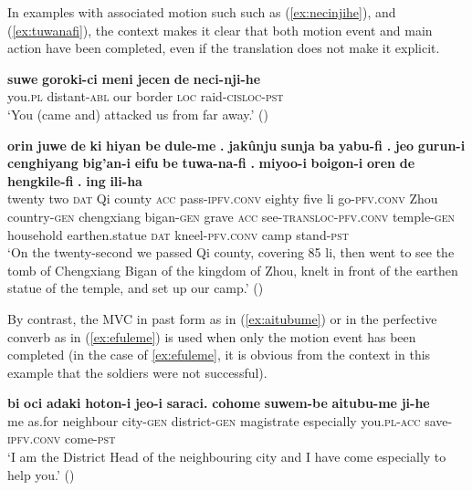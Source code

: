 \documentclass{article}
\newcommand{\ipa}[1]{\textbf{{\phon\mbox{#1}}}} %
\begin{document}
In examples with associated motion such such as (\ref{ex:necinjihe}), and (\ref{ex:tuwanafi}), the context makes it clear that both motion event and main action have been completed, even if the translation does not make it explicit.
\begin{exe}
\ex \label{ex:necinjihe}
\gll
\ipa{suwe}	\ipa{goroki-ci}	\ipa{meni}	\ipa{jecen}	\ipa{de}	\ipa{neci-nji-he}	 \\
you.\textsc{pl} distant-\textsc{abl} our border \textsc{loc} raid-\textsc{cisloc-pst} \\
\glt ‘You (came and) attacked us from far away.' (\citealt[503;870]{stary83sakda})
\end{exe}
\begin{exe}
\ex \label{ex:tuwanafi}
\gll
\ipa{orin} 	\ipa{juwe} 	\ipa{de} 	\ipa{ki} 	\ipa{hiyan} 	\ipa{be} 	\ipa{dule-me} 	\ipa{.} 	\ipa{jakûnju} 	\ipa{sunja} 	\ipa{ba} 	\ipa{yabu-fi} 	\ipa{.} 	\ipa{jeo} 	\ipa{gurun-i} 	\ipa{cenghiyang} 	\ipa{big’an-i} 	\ipa{eifu} 	\ipa{be} 	\ipa{tuwa-na-fi} 	\ipa{.} 	\ipa{miyoo-i} 	\ipa{boigon-i} 	\ipa{oren} 	\ipa{de} 	\ipa{hengkile-fi} 	\ipa{.} 	\ipa{ing} 	\ipa{ili-ha} \\
twenty two \textsc{dat} Qi county \textsc{acc} pass-\textsc{ipfv.conv} { } eighty five li  go-\textsc{pfv.conv} { } Zhou country-\textsc{gen} chengxiang bigan-\textsc{gen} grave \textsc{acc} see-\textsc{transloc-pfv.conv} { } temple-\textsc{gen} household earthen.statue \textsc{dat} kneel-\textsc{pfv.conv} { } camp stand-\textsc{pst} \\
\glt `On the twenty-second we passed Qi county, covering 85 li, then went to see the tomb of Chengxiang Bigan of the kingdom of Zhou, knelt in front of the earthen statue of the temple, and set up our camp.' (\citealt[83/103]{cosmo06dzengseo})
\end{exe}

By contrast, the MVC in past form as in (\ref{ex:aitubume}) or in the perfective converb as in (\ref{ex:efuleme}) is used when only the motion event has been completed (in the case of \ref{ex:efuleme}, it is obvious from the context in this example that the soldiers were not successful).

\begin{exe}
\ex \label{ex:aitubume}
\gll
\ipa{bi}	\ipa{oci}	\ipa{adaki}	\ipa{hoton-i}	\ipa{jeo-i}	\ipa{saraci.}	\ipa{cohome}	\ipa{suwem-be}	\ipa{aitubu-me}	\ipa{ji-he} \\
me as.for neighbour city-\textsc{gen} district-\textsc{gen} magistrate especially you.\textsc{pl}-\textsc{acc} save-\textsc{ipfv.conv} come-\textsc{pst} \\
‘I am the District Head of the neighbouring city and I have come especially to help you.’ (\citealt[397;291]{stary83sakda})
\end{exe}
\end{document}
